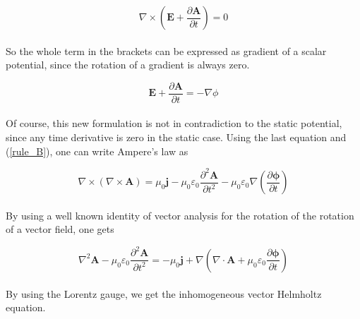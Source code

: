 \documentclass[a4paper,10pt]{thesis}
\begin{document}
\begin{equation}
\nabla \times \left( \mathbf{E}+\frac{\partial \mathbf{A}}{\partial t} \right) = 0
\end{equation}

\paragraph*{}
So the whole term in the brackets can be expressed as gradient of a scalar potential, since the rotation of a gradient is always zero.

\begin{equation}\label{expressed_as_gradient}
\mathbf{E}+\frac{\partial \mathbf{A}}{\partial t} = -\nabla \phi
\end{equation}

\paragraph*{}
Of course, this new formulation is not in contradiction to the static potential, since any time derivative is zero in the static case. Using the last equation and (\ref{rule_B}), one can write Ampere's law as

\begin{equation}
\nabla \times ( \nabla \times \mathbf{A} ) =\mu_0 \mathbf{j}-\mu_0 \varepsilon_0 \frac{\partial^2 \mathbf{A}}{\partial t^2}- \mu_0 \varepsilon_0 \nabla \left( \frac{\partial \mathbf{\phi}}{\partial t} \right)
\end{equation}

\paragraph*{}
By using a well known identity of vector analysis for the rotation of the rotation of a vector field, one gets

\begin{equation}
\nabla^2 \mathbf{A} - \mu_0 \varepsilon_0 \frac{\partial^2 \mathbf{A}}{\partial t^2} =-\mu_0 \mathbf{j}+\nabla \left( \nabla \cdot \mathbf{A} + \mu_0 \varepsilon_0 \frac{\partial \mathbf{\phi}}{\partial t} \right)
\end{equation}

\paragraph*{}
By using the Lorentz gauge, we get the inhomogeneous vector Helmholtz equation.
\end{document}
